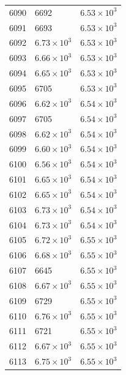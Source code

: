 \begin{table}[H]
\begin{tabular}{lll}
6090 & 6692 & $\displaystyle 6.53 \times 10^{3}$ \\
6091 & 6693 & $\displaystyle 6.53 \times 10^{3}$ \\
6092 & $\displaystyle 6.73 \times 10^{3}$ & $\displaystyle 6.53 \times 10^{3}$ \\
6093 & $\displaystyle 6.66 \times 10^{3}$ & $\displaystyle 6.53 \times 10^{3}$ \\
6094 & $\displaystyle 6.65 \times 10^{3}$ & $\displaystyle 6.53 \times 10^{3}$ \\
6095 & 6705 & $\displaystyle 6.53 \times 10^{3}$ \\
6096 & $\displaystyle 6.62 \times 10^{3}$ & $\displaystyle 6.54 \times 10^{3}$ \\
6097 & 6705 & $\displaystyle 6.54 \times 10^{3}$ \\
6098 & $\displaystyle 6.62 \times 10^{3}$ & $\displaystyle 6.54 \times 10^{3}$ \\
6099 & $\displaystyle 6.60 \times 10^{3}$ & $\displaystyle 6.54 \times 10^{3}$ \\
6100 & $\displaystyle 6.56 \times 10^{3}$ & $\displaystyle 6.54 \times 10^{3}$ \\
6101 & $\displaystyle 6.65 \times 10^{3}$ & $\displaystyle 6.54 \times 10^{3}$ \\
6102 & $\displaystyle 6.65 \times 10^{3}$ & $\displaystyle 6.54 \times 10^{3}$ \\
6103 & $\displaystyle 6.73 \times 10^{3}$ & $\displaystyle 6.54 \times 10^{3}$ \\
6104 & $\displaystyle 6.73 \times 10^{3}$ & $\displaystyle 6.54 \times 10^{3}$ \\
6105 & $\displaystyle 6.72 \times 10^{3}$ & $\displaystyle 6.55 \times 10^{3}$ \\
6106 & $\displaystyle 6.68 \times 10^{3}$ & $\displaystyle 6.55 \times 10^{3}$ \\
6107 & 6645 & $\displaystyle 6.55 \times 10^{3}$ \\
6108 & $\displaystyle 6.67 \times 10^{3}$ & $\displaystyle 6.55 \times 10^{3}$ \\
6109 & 6729 & $\displaystyle 6.55 \times 10^{3}$ \\
6110 & $\displaystyle 6.76 \times 10^{3}$ & $\displaystyle 6.55 \times 10^{3}$ \\
6111 & 6721 & $\displaystyle 6.55 \times 10^{3}$ \\
6112 & $\displaystyle 6.67 \times 10^{3}$ & $\displaystyle 6.55 \times 10^{3}$ \\
6113 & $\displaystyle 6.75 \times 10^{3}$ & $\displaystyle 6.55 \times 10^{3}$ \\

\end{tabular}
\end{table}
